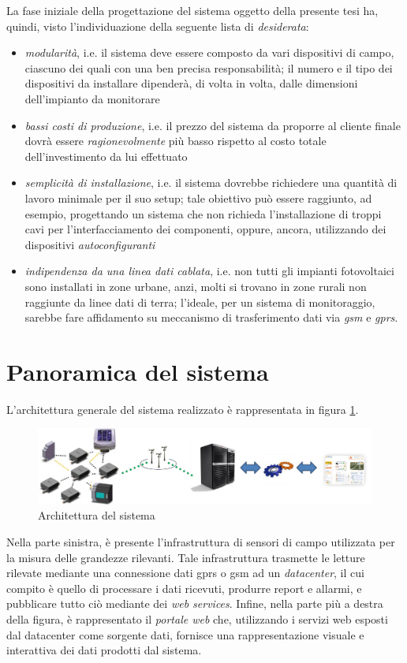 %
La fase iniziale della progettazione del sistema oggetto della presente tesi
ha, quindi, visto l'individuazione della seguente lista di \emph{desiderata}:
%
\begin{itemize}
\item \emph{modularit\`a}, i.e. il sistema deve essere composto da vari dispositivi di 
      campo, ciascuno dei quali con una ben precisa responsabilit\`a; il numero e il 
      tipo dei dispositivi da installare dipender\`a, di volta in volta, dalle dimensioni 
      dell'impianto da monitorare
%
\item \emph{bassi costi di produzione}, i.e. il prezzo del sistema da proporre al cliente 
      finale dovr\`a essere \emph{ragionevolmente} pi\`u basso rispetto al costo totale 
      dell'investimento da lui effettuato
%
\item \emph{semplicit\`a di installazione}, i.e. il sistema dovrebbe richiedere una quantit\`a
      di lavoro minimale per il suo setup; tale obiettivo pu\`o essere raggiunto, ad esempio,  
      progettando un sistema che non richieda l'installazione di troppi cavi per 
      l'interfacciamento dei componenti, oppure, ancora, utilizzando dei dispositivi 
      \emph{autoconfiguranti}
%      
\item \emph{indipendenza da una linea dati cablata}, i.e. non tutti gli impianti fotovoltaici
      sono installati in zone urbane, anzi, molti si trovano in zone rurali non raggiunte da linee 
      dati di terra; l'ideale, per un sistema di monitoraggio, sarebbe fare affidamento
      su meccanismo di trasferimento dati via \emph{gsm} e \emph{gprs}.
%
\end{itemize}
%

\section{Panoramica del sistema}
%
L'architettura generale del sistema realizzato \`e rappresentata in figura 
\ref{architettura-sistema}.
%
\begin{figure}[!h]
\centering
\includegraphics[width=400pt]{img/architecture.png}
\caption{Architettura del sistema}
\label{architettura-sistema}
\end{figure}
%
Nella parte sinistra, \`e presente l'infrastruttura di sensori di campo 
utilizzata per la misura delle grandezze rilevanti.
%
Tale infrastruttura trasmette le letture rilevate mediante una connessione dati 
gprs o gsm ad un \emph{datacenter}, il cui compito \`e quello di processare i dati 
ricevuti, produrre report e allarmi, e pubblicare tutto ci\`o mediante dei 
\emph{web services}.
%
Infine, nella parte pi\`u a destra della figura, \`e rappresentato il \emph{portale web} 
che, utilizzando i servizi web esposti dal datacenter come sorgente dati, fornisce 
una rappresentazione visuale e interattiva dei dati prodotti dal sistema.
%

